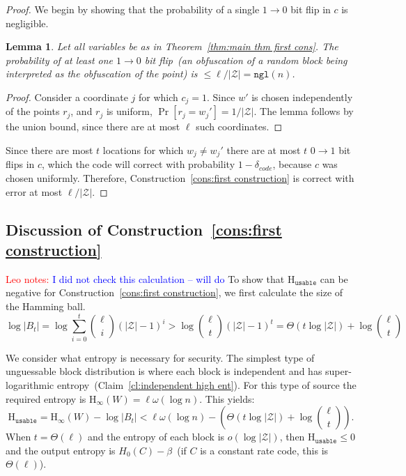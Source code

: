 \documentclass[11pt]{article}
\newcommand{\thref}[1]{\mbox{Theorem~\ref{#1}}}
\newcommand{\clref}[1]{\mbox{Claim~\ref{#1}}}
\newcommand{\consref}[1]{\mbox{Construction~\ref{#1}}}
\newcommand{\dis}{\ensuremath{\mathsf{dis}}}
\newcommand{\ngl}{\ensuremath{\mathtt{ngl}}\xspace}
\newcommand{\Hoo}{\mathrm{H}_\infty}
\newcommand{\Huse}{\mathrm{H}_{\mathtt{usable}}}
\newtheorem{lemma}[theorem]{Lemma}
\newcommand{\authnote}[2]{{\textcolor{red}{\textsf{#1 notes: }\textcolor{blue}{ #2}}\marginpar{\textcolor{red}{\textbf{!!!!!}}}}}
\newcommand{\authnote}[2]{}
\newcommand{\lnote}[1]{{\authnote{Leo}{#1}}}
\begin{document}
\begin{proof}
We begin by showing that the probability of a single $1\rightarrow 0$ bit flip in $c$ is negligible.
\begin{lemma}
\label{lem:no 1 to 0 flips}
Let all variables be as in \thref{thm:main thm first cons}.
The probability of at least one $1\rightarrow 0$ bit flip~(an obfuscation of a random block being interpreted as the obfuscation of the point) is $ \le \ell/|\mathcal{Z}| = \ngl(n)$.
\end{lemma}
\begin{proof}
Consider a coordinate $j$ for which $c_j=1$. Since $w'$ is chosen independently of the points $r_j$, and $r_j$ is uniform, $\Pr[r_j =w_j']  = 1/|\mathcal{Z}|$. The lemma follows by the union bound, since there are at most $\ell$ such coordinates.
\end{proof}

Since there are most $t$ locations for which $w_j\neq w_j'$ there are at most $t$ $0\rightarrow 1$ bit flips in $c$, which the code will correct with probability $1-\delta_{code}$, because $c$ was chosen uniformly.
Therefore, \consref{cons:first construction} is correct with error at most $\ell/|\mathcal{Z}|$.
\end{proof}


\subsection{Discussion of \consref{cons:first construction}}
\label{sec:discussion}
\lnote{I did not check this calculation -- will do}
To show that $\Huse$ can be negative for \consref{cons:first construction}, we first calculate the size of the Hamming ball.
\[
\log |B_t| = \log \sum_{i=0}^t {\ell \choose i} (|\mathcal{Z}|-1)^i> \log {\ell \choose t} (|\mathcal{Z}|-1)^t =\Theta(t\log |\mathcal{Z}|) + \log {\ell\choose t}
\]

We consider what entropy is necessary for security.  The simplest type of unguessable block distribution is where each block is independent and has super-logarithmic entropy~(\clref{cl:independent high ent}).  For this type of source the required entropy is $\Hoo(W) = \ell\omega(\log n)$.  This yields:
\[
\Huse = \Hoo(W) - \log |B_t| < \ell \omega(\log n) -\left( \Theta(t\log |\mathcal{Z}|) + \log {\ell \choose t}\right).
\]
When $t =\Theta(\ell)$ and the entropy of each block is $o(\log |\mathcal{Z}|)$, then $\Huse\le 0$ and the output entropy is $H_0(C) -\beta$~(if $C$ is a constant rate code, this is $\Theta(\ell)$).
\end{document}

